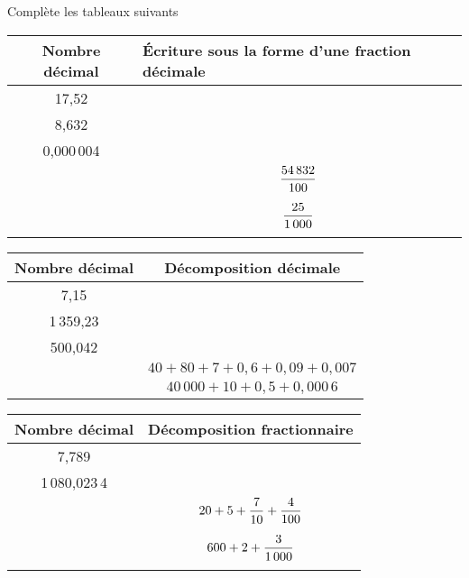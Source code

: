 Complète les tableaux suivants\par
\renewcommand{\arraystretch}{2}
\begin{tabularx}{0.48\linewidth}{|c|X|}
\hline
{\small Nombre décimal}&{\small \'Ecriture sous la forme d'une fraction décimale}\\
\hline
17,52&\\
\hline
8,632&\\
\hline
0,000\,004&\\
\hline
&\multicolumn{1}{c|}{$\dfrac{54\,832}{\strut 100}$}\\
\hline
&\multicolumn{1}{c|}{$\dfrac{25}{\strut 1\,000}$}\\
\hline
\end{tabularx}
\hfill
\begin{tabularx}{0.5\linewidth}{|c|c|}
\hline
{\small Nombre décimal}&{\small Décomposition décimale}\\
\hline
7,15&\\
\hline
1\,359,23&\\
\hline
500,042&\\
\hline
&\multicolumn{1}{c|}{$40+80+7+0,6+0,09+0,007$}\\
\hline
&\multicolumn{1}{c|}{$40\,000+10+0,5+0,000\,6$}\\
\hline
\end{tabularx}
\par
\begin{center}
\begin{tabularx}{0.70\linewidth}{|c|X|}
\hline
{\small Nombre décimal}&\multicolumn{1}{c|}{\small Décomposition fractionnaire}\\
\hline
7,789&\\
\hline
1\,080,023\,4&\\
\hline
&\multicolumn{1}{c|}{$20+5+\dfrac7{\strut 10}+\dfrac4{100}$}\\
\hline
&\multicolumn{1}{c|}{$600+2+\dfrac3{\strut 1\,000}$}\\
\hline
\end{tabularx}
\end{center}